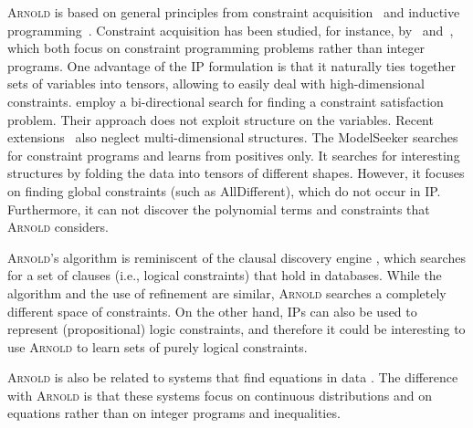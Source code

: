\documentclass{article}
\newcommand{\stefano}[1]{{\bf \textcolor{violet}{{Stefano: #1}}}}
\newcommand{\learner}{\textsc{Arnold}\xspace}
\renewcommand\[{\begin{equation}}
\renewcommand\]{\end{equation}}
\begin{document}
\learner is based on general principles from constraint
acquisition~\cite{de2018learning,bessiere2017constraint} and inductive
programming~\cite{de2008logical}.  Constraint acquisition has been studied, for
instance, by~\cite{bessiere2017constraint} and~\cite{beldiceanu2012model},
which both focus on constraint programming problems rather than integer
programs.  One advantage of the IP formulation is that it naturally ties
together sets of variables into tensors, allowing to easily deal with
high-dimensional constraints.  \cite{bessiere2017constraint} employ a
bi-directional search for finding
a constraint satisfaction problem.  Their approach does not exploit structure
on the variables.  Recent
extensions~\cite{arcangioli2016multiple,tsouros2018efficient} also neglect
multi-dimensional structures.
The ModelSeeker \cite{beldiceanu2012model} searches for constraint programs and
learns from positives only.  It searches for interesting structures by folding
the data into tensors of different shapes.  However, it focuses on finding
global constraints (such as AllDifferent), which do not occur in IP.
Furthermore, it can not discover the polynomial terms and constraints that
\learner considers.

\learner's algorithm is reminiscent of the clausal discovery engine
\cite{de1997clausal}, which searches for a set of clauses (i.e., logical
constraints) that hold in databases.  While the algorithm and the use of
refinement are similar, \learner searches a completely different space of
constraints.  On the other hand, IPs can also be used to represent
(propositional) logic constraints, and therefore it could be interesting to use
\learner to learn sets of purely logical constraints.

\learner is also be related to systems that find equations in data
\cite{todorovski1997declarative,lloyd2014automatic}. The difference with \learner is that these systems
focus on continuous distributions and on equations rather than on integer
programs and inequalities.

%
\end{document}
